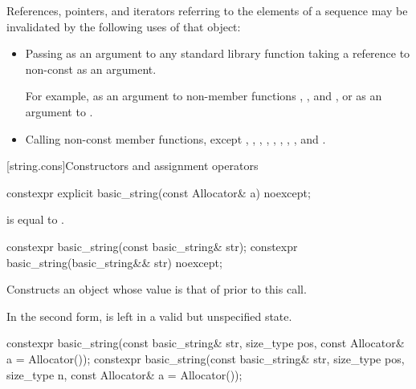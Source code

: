 \pnum
References, pointers, and iterators referring to the elements of a
 sequence may be
invalidated by the following uses of that  object:
\begin{itemize}
\item Passing as an argument to any standard library function taking a reference to non-const
 as an argument.
\begin{footnote}
For example, as an argument to non-member
functions ,
, and , or as
an argument to .
\end{footnote}

\item Calling non-const member functions, except
,
,
,
,
,
,
,
,
and
.
\end{itemize}

[string.cons]{Constructors and assignment operators}

%
\begin{itemdecl}
constexpr explicit basic_string(const Allocator& a) noexcept;
\end{itemdecl}

\begin{itemdescr}

\pnum
\ensures
{} is equal to .
\end{itemdescr}

%
\begin{itemdecl}
constexpr basic_string(const basic_string& str);
constexpr basic_string(basic_string&& str) noexcept;
\end{itemdecl}

\begin{itemdescr}
\pnum
\effects
Constructs an object whose
value is that of  prior to this call.

\pnum
\remarks
In the second form,  is left in a valid but unspecified state.
\end{itemdescr}

%
\begin{itemdecl}
constexpr basic_string(const basic_string& str, size_type pos,
                       const Allocator& a = Allocator());
constexpr basic_string(const basic_string& str, size_type pos, size_type n,
                       const Allocator& a = Allocator());
\end{itemdecl}

